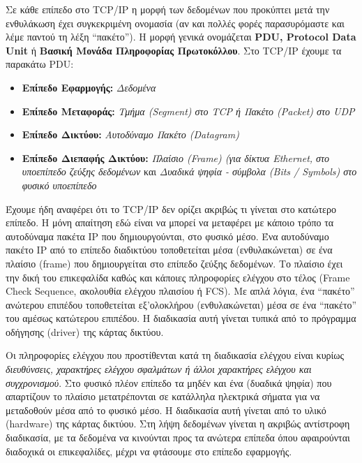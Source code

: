 Σε κάθε επίπεδο στο TCP/IP η μορφή των δεδομένων που προκύπτει μετά την ενθυλάκωση έχει συγκεκριμένη ονομασία (αν και πολλές φορές παρασυρόμαστε και λέμε παντού τη λέξη ``πακέτο''). Η μορφή γενικά ονομάζεται \textbf{PDU, Protocol Data Unit} ή \textbf{Βασική Μονάδα Πληροφορίας Πρωτοκόλλου}. Στο TCP/IP έχουμε τα παρακάτω PDU:

\begin{itemize}
\item \textbf{Επίπεδο Εφαρμογής:} \emph{Δεδομένα}
\item \textbf{Επίπεδο Μεταφοράς:} \emph{Τμήμα (Segment) στο TCP ή Πακέτο (Packet) στο UDP}
\item \textbf{Επίπεδο Δικτύου:} \emph{Αυτοδύναμο Πακέτο (Datagram)}
\item \textbf{Επίπεδο Διεπαφής Δικτύου:} \emph{Πλαίσιο (Frame) (για δίκτυα Ethernet, στο υποεπίπεδο ζεύξης δεδομένων} και \emph{Δυαδικά ψηφία - σύμβολα (Bits / Symbols) στο φυσικό υποεπίπεδο}
\end{itemize}

Έχουμε ήδη αναφέρει ότι το TCP/IP δεν ορίζει ακριβώς τι γίνεται στο κατώτερο επίπεδο. Η μόνη απαίτηση εδώ είναι να μπορεί να μεταφέρει με κάποιο τρόπο τα αυτοδύναμα πακέτα IP που δημιουργούνται, στο φυσικό μέσο. Ένα αυτοδύναμο πακέτο IP από το επίπεδο διαδικτύου τοποθετείται μέσα (ενθυλακώνεται) σε ένα πλαίσιο (frame) που δημιουργείται στο επίπεδο ζεύξης δεδομένων. Το πλαίσιο έχει την δική του επικεφαλίδα καθώς και κάποιες πληροφορίες ελέγχου στο τέλος (Frame Check Sequence, ακολουθία ελέγχου πλαισίου ή FCS). Με απλά λόγια, ένα ``πακέτο'' ανώτερου επιπέδου τοποθετείται εξ'ολοκλήρου (ενθυλακώνεται) μέσα σε ένα ``πακέτο'' του αμέσως κατώτερου επιπέδου. Η διαδικασία αυτή γίνεται τυπικά από το πρόγραμμα οδήγησης (driver) της κάρτας δικτύου.

Οι πληροφορίες ελέγχου που προστίθενται κατά τη διαδικασία ελέγχου είναι κυρίως \emph{διευθύνσεις, χαρακτήρες ελέγχου σφαλμάτων ή άλλοι χαρακτήρες ελέγχου και συγχρονισμού}. Στο φυσικό πλέον επίπεδο τα μηδέν και ένα (δυαδικά ψηφία) που απαρτίζουν το πλαίσιο μετατρέπονται σε κατάλληλα ηλεκτρικά σήματα για να μεταδοθούν μέσα από το φυσικό μέσο. Η διαδικασία αυτή γίνεται από το υλικό (hardware) της κάρτας δικτύου. Στη λήψη δεδομένων γίνεται η ακριβώς αντίστροφη διαδικασία, με τα δεδομένα να κινούνται προς τα ανώτερα επίπεδα όπου αφαιρούνται διαδοχικά οι επικεφαλίδες, μέχρι να φτάσουμε στο επίπεδο εφαρμογής.